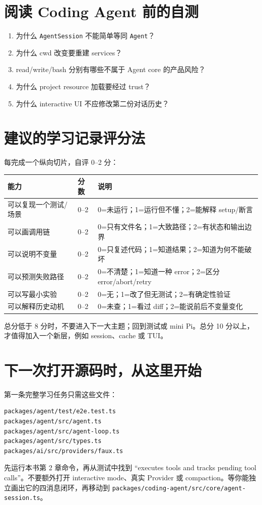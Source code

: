 \documentclass[UTF8,openany,11pt]{ctexbook}
\newcommand{\pathref}[1]{\texttt{#1}}
\begin{document}
\section{阅读 Coding Agent 前的自测}
\begin{enumerate}
\item 为什么 \texttt{AgentSession} 不能简单等同 \texttt{Agent}？
\item 为什么 cwd 改变要重建 services？
\item read/write/bash 分别有哪些不属于 Agent core 的产品风险？
\item 为什么 project resource 加载要经过 trust？
\item 为什么 interactive UI 不应修改第二份对话历史？
\end{enumerate}

\section{建议的学习记录评分法}
每完成一个纵向切片，自评 0--2 分：
\begin{longtable}{p{}p{}p{}}
\toprule
能力 & 分数 & 说明\\
\midrule
可以复现一个测试/场景 & 0--2 & 0=未运行；1=运行但不懂；2=能解释 setup/断言\\
可以画调用链 & 0--2 & 0=只有文件名；1=大致路径；2=有状态和输出边界\\
可以说明不变量 & 0--2 & 0=只复述代码；1=知道结果；2=知道为何不能破坏\\
可以预测失败路径 & 0--2 & 0=不清楚；1=知道一种 error；2=区分 error/abort/retry\\
可以写最小实验 & 0--2 & 0=无；1=改了但无测试；2=有确定性验证\\
可以解释历史动机 & 0--2 & 0=未查；1=看过 diff；2=能说前后不变量变化\\
\bottomrule
\end{longtable}
总分低于 8 分时，不要进入下一大主题；回到测试或 mini Pi。总分 10 分以上，才值得加入一个新层，例如 session、cache 或 TUI。

\section{下一次打开源码时，从这里开始}
第一条完整学习任务只需这些文件：
\begin{Verbatim}[fontsize=\small]
packages/agent/test/e2e.test.ts
packages/agent/src/agent.ts
packages/agent/src/agent-loop.ts
packages/agent/src/types.ts
packages/ai/src/providers/faux.ts
\end{Verbatim}
先运行本书第 2 章命令，再从测试中找到 ``executes tools and tracks pending tool calls''。不要额外打开 interactive mode、真实 Provider 或 compaction。等你能独立画出它的四消息闭环，再移动到 \pathref{packages/coding-agent/src/core/agent-session.ts}。
\end{document}

